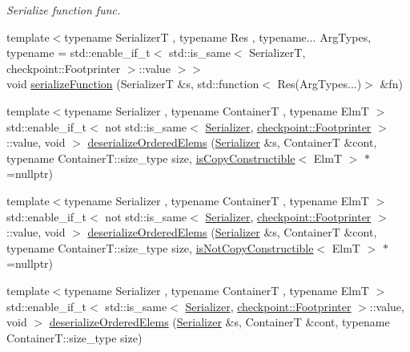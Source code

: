 \begin{DoxyCompactItemize}
\begin{DoxyCompactList}\small\item\em Serialize function {\ttfamily func}. \end{DoxyCompactList}\item 
{\footnotesize template$<$typename SerializerT , typename Res , typename... Arg\+Types, typename  = std\+::enable\+\_\+if\+\_\+t$<$    std\+::is\+\_\+same$<$      Serializer\+T,      checkpoint\+::\+Footprinter    $>$\+::value  $>$$>$ }\\void \hyperlink{namespacecheckpoint_a4161978e6d6de385d942cbcbe659817a}{serialize\+Function} (SerializerT \&s, std\+::function$<$ Res(Arg\+Types...)$>$ \&fn)
\item 
{\footnotesize template$<$typename Serializer , typename ContainerT , typename ElmT $>$ }\\std\+::enable\+\_\+if\+\_\+t$<$ not std\+::is\+\_\+same$<$ \hyperlink{structcheckpoint_1_1_serializer}{Serializer}, \hyperlink{structcheckpoint_1_1_footprinter}{checkpoint\+::\+Footprinter} $>$\+::value, void $>$ \hyperlink{namespacecheckpoint_af1b8445cbd2caf9c35727de1cf63c2d9}{deserialize\+Ordered\+Elems} (\hyperlink{structcheckpoint_1_1_serializer}{Serializer} \&s, ContainerT \&cont, typename Container\+T\+::size\+\_\+type size, \hyperlink{namespacecheckpoint_a60a9850fa59d4b236b2f888baf135a95}{is\+Copy\+Constructible}$<$ ElmT $>$ $\ast$=nullptr)
\item 
{\footnotesize template$<$typename Serializer , typename ContainerT , typename ElmT $>$ }\\std\+::enable\+\_\+if\+\_\+t$<$ not std\+::is\+\_\+same$<$ \hyperlink{structcheckpoint_1_1_serializer}{Serializer}, \hyperlink{structcheckpoint_1_1_footprinter}{checkpoint\+::\+Footprinter} $>$\+::value, void $>$ \hyperlink{namespacecheckpoint_abec445c1387cfe9c00c3c328b403378b}{deserialize\+Ordered\+Elems} (\hyperlink{structcheckpoint_1_1_serializer}{Serializer} \&s, ContainerT \&cont, typename Container\+T\+::size\+\_\+type size, \hyperlink{namespacecheckpoint_a141a100f9dcca06fb0b6dbf44a5d6756}{is\+Not\+Copy\+Constructible}$<$ ElmT $>$ $\ast$=nullptr)
\item 
{\footnotesize template$<$typename Serializer , typename ContainerT , typename ElmT $>$ }\\std\+::enable\+\_\+if\+\_\+t$<$ std\+::is\+\_\+same$<$ \hyperlink{structcheckpoint_1_1_serializer}{Serializer}, \hyperlink{structcheckpoint_1_1_footprinter}{checkpoint\+::\+Footprinter} $>$\+::value, void $>$ \hyperlink{namespacecheckpoint_a9976fffc8f39073e5b40ec61d93a5482}{deserialize\+Ordered\+Elems} (\hyperlink{structcheckpoint_1_1_serializer}{Serializer} \&s, ContainerT \&cont, typename Container\+T\+::size\+\_\+type size)

\end{DoxyCompactItemize}
